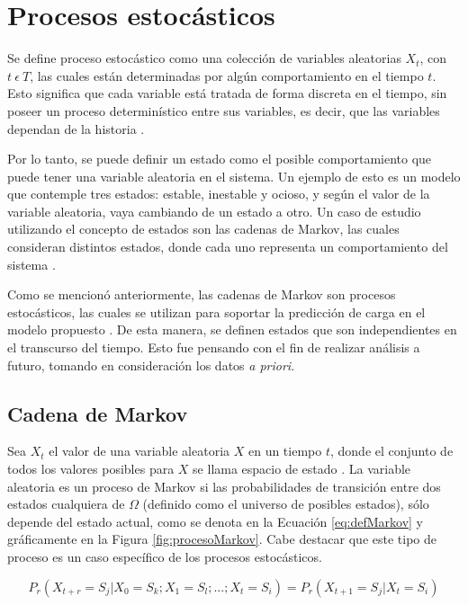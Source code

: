 \section{Procesos estocásticos}
\label{sec:procesosEstocasticos}

Se define proceso estocástico como una colección de variables aleatorias {$X_t$, con $t ~ \epsilon ~ T$}, las cuales están determinadas por algún comportamiento en el tiempo $t$. Esto significa que cada variable está tratada de forma discreta en el tiempo, sin poseer un proceso determinístico entre sus variables, es decir, que las variables dependan de la historia \citep{taylor2014introduction}.

Por lo tanto, se puede definir un estado como el posible comportamiento que puede tener una variable aleatoria en el sistema. Un ejemplo de esto es un modelo que contemple tres estados: estable, inestable y ocioso, y según el valor de la variable aleatoria, vaya cambiando de un estado a otro. Un caso de estudio utilizando el concepto de estados son las cadenas de Markov, las cuales consideran distintos estados, donde cada uno representa un comportamiento del sistema \citep{de1978calculus}.

Como se mencionó anteriormente, las cadenas de Markov son procesos estocásticos, las cuales se utilizan para soportar la predicción de carga en el modelo propuesto \citep{GongGW10}. De esta manera, se definen estados que son independientes en el transcurso del tiempo. Esto fue pensando con el fin de realizar análisis a futuro, tomando en consideración los datos \textit{a priori}.

\subsection{Cadena de Markov}
\label{subsec:cadenaMarkov}

Sea $X_t$ el valor de una variable aleatoria $X$ en un tiempo $t$, donde el conjunto de todos los valores posibles para $X$ se llama espacio de estado \citep{ching2006markov}. La variable aleatoria es un proceso de Markov si las probabilidades de transición entre dos estados cualquiera de $\Omega$ (definido como el universo de posibles estados), sólo depende del estado actual, como se denota en la Ecuación \ref{eq:defMarkov} y gráficamente en la Figura \ref{fig:procesoMarkov}. Cabe destacar que este tipo de proceso es un caso específico de los procesos estocásticos.

\begin{equation} \label{eq:defMarkov} 
	P_r(X_{t+r} = S_j | X_0 = S_k ; X_1 = S_l ; ... ; X_t = S_i) = P_r(X_{t+1} = S_j | X_t = S_i)
\end{equation}

